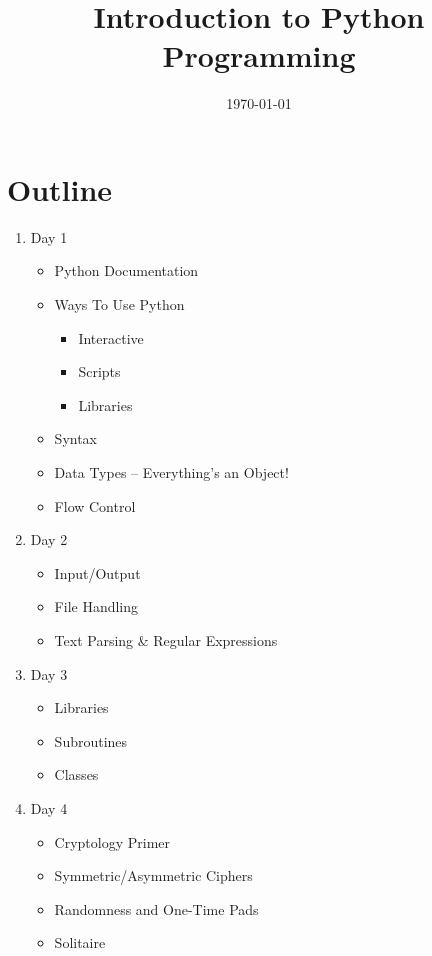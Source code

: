 \documentclass[11pt,letterpaper]{article}
\begin{document}
\title{Introduction to Python Programming}
\author{}
\date{\today}
\maketitle

\section{Outline}
\begin{enumerate}
    \item{Day 1}
    \begin{itemize}
    \item{Python Documentation}
    \item{Ways To Use Python}
    \begin{itemize}
        \item Interactive
        \item Scripts
        \item Libraries
    \end{itemize}
    \item{Syntax}
    \item{Data Types} -- Everything's an Object!
    \item{Flow Control}
    \end{itemize}

    \item{Day 2}
    \begin{itemize}
    \item{Input/Output}
    \item{File Handling}
    \item{Text Parsing \& Regular Expressions}
    \end{itemize}
    
    \item{Day 3}
    \begin{itemize}
    \item{Libraries}
    \item{Subroutines}
    \item{Classes}
    \end{itemize}

    \item{Day 4}
    \begin{itemize}
    \item{Cryptology Primer}
    \item{Symmetric/Asymmetric Ciphers}
    \item{Randomness and One-Time Pads}
    \item{Solitaire}
    \end{itemize}


\end{enumerate}
\end{document}
